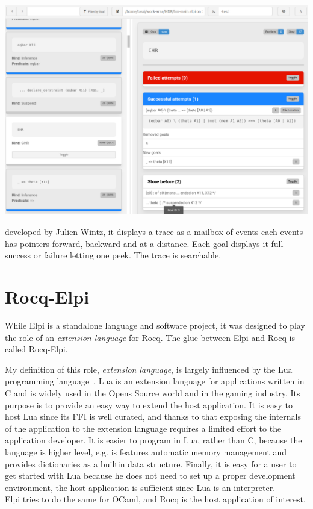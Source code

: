 \documentclass[a4paper, 11pt]{book}
\begin{document}
\includegraphics[width=.9\textwidth]{trace}

developed by Julien Wintz, it displays a trace as a mailbox of events
each events has pointers forward, backward and at a distance.
Each goal displays it full success or failure letting one
peek. The trace is searchable.

\chapter{Rocq-Elpi}\label{sec:rocq}

While Elpi is a standalone language and software project, it was designed to
play the role of an \emph{extension language} for Rocq. The glue between Elpi and
Rocq is called Rocq-Elpi.

My definition of this role, \emph{extension language}, is largely influenced
by the Lua programming language~\cite{10.5555/1200583}. Lua is an extension
language for applications written in C and is widely used in the Opens Source
world and in the gaming industry.
Its purpose is to provide an easy way to extend the host application.
It is easy to host Lua since its FFI is well curated, and thanks to that
exposing the internals of the application to the extension language requires a
limited effort to the application developer. It is easier to program in Lua,
rather than C, because the language is higher level, e.g. is features automatic
memory management and provides dictionaries as a builtin data structure.
Finally, it is easy for a user to get started with Lua because he does not need
to set up a proper development environment, the host application is sufficient
since Lua is an interpreter.\\
Elpi tries to do the same for OCaml, and Rocq is the host application of interest.
\end{document}
